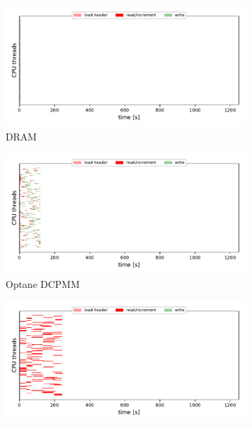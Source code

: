 \begin{figure}
    \begin{subfigure}{0.5\textwidth}
        \centering
    \includegraphics[width=\columnwidth]{figures/optane/gantt-1572380543-tmpfsAD_1it_25cpus_40bb-1.pdf}
    \caption{DRAM}
\end{subfigure}
\begin{subfigure}{0.5\textwidth}
        \centering
    \includegraphics[width=\columnwidth]{figures/optane/gantt-1572382482-optaneAD_1it_25cpus_40bb-1.pdf}
    \caption{Optane DCPMM}
\end{subfigure}
\begin{subfigure}{0.5\textwidth}
        \centering
    \includegraphics[width=\columnwidth]{figures/optane/gantt-1572382794-localAD_1it_25cpus_40bb-1.pdf}

\end{subfigure}
\end{figure}
